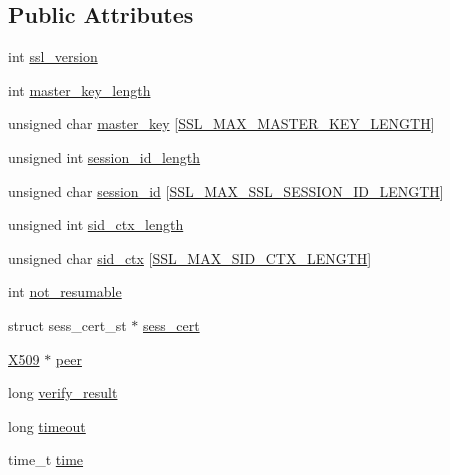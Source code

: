 \subsection*{Public Attributes}
\begin{DoxyCompactItemize}
\item 
int \hyperlink{structssl__session__st_a551e39a73ea78af29979d80d8a6db6f9}{ssl\+\_\+version}
\item 
int \hyperlink{structssl__session__st_a368c71211d55bcd3528a752c15e14e5d}{master\+\_\+key\+\_\+length}
\item 
unsigned char \hyperlink{structssl__session__st_ae0d5ecf4472dbff80b1ed36ce9c051c3}{master\+\_\+key} \mbox{[}\hyperlink{ssl_8h_ab96c69cdc3051de20ca9bb157d790f4a}{S\+S\+L\+\_\+\+M\+A\+X\+\_\+\+M\+A\+S\+T\+E\+R\+\_\+\+K\+E\+Y\+\_\+\+L\+E\+N\+G\+TH}\mbox{]}
\item 
unsigned int \hyperlink{structssl__session__st_a593371acd210b99ad600853361b807ce}{session\+\_\+id\+\_\+length}
\item 
unsigned char \hyperlink{structssl__session__st_a3e03d6073d29316d9eaecb78938ec92f}{session\+\_\+id} \mbox{[}\hyperlink{ssl_8h_a918194c29290f107e9440a722af9c2c6}{S\+S\+L\+\_\+\+M\+A\+X\+\_\+\+S\+S\+L\+\_\+\+S\+E\+S\+S\+I\+O\+N\+\_\+\+I\+D\+\_\+\+L\+E\+N\+G\+TH}\mbox{]}
\item 
unsigned int \hyperlink{structssl__session__st_a22ec3aac135c2b8268e0ea69c66fc829}{sid\+\_\+ctx\+\_\+length}
\item 
unsigned char \hyperlink{structssl__session__st_ad465f7554a5e14d6c92ee563d5ed6fe1}{sid\+\_\+ctx} \mbox{[}\hyperlink{ssl_8h_a5cef804495c6414283f4f29d4cea0dd0}{S\+S\+L\+\_\+\+M\+A\+X\+\_\+\+S\+I\+D\+\_\+\+C\+T\+X\+\_\+\+L\+E\+N\+G\+TH}\mbox{]}
\item 
int \hyperlink{structssl__session__st_a1b4d198b4cf95c73b1e73b06cf521bac}{not\+\_\+resumable}
\item 
struct sess\+\_\+cert\+\_\+st $\ast$ \hyperlink{structssl__session__st_abd0e4711818e1c3373870f0e09d718be}{sess\+\_\+cert}
\item 
\hyperlink{ossl__typ_8h_a4f666bde6518f95deb3050c54b408416}{X509} $\ast$ \hyperlink{structssl__session__st_a925bea83587ffedbbdb4aa386b75a2d7}{peer}
\item 
long \hyperlink{structssl__session__st_a448769f219815a3a49b726d5ab288783}{verify\+\_\+result}
\item 
long \hyperlink{structssl__session__st_a69db42a9260a726806b5f6f92923c90b}{timeout}
\item 
time\+\_\+t \hyperlink{structssl__session__st_afa2f9b8bc29e2d00641c609f54bcfc4b}{time}

\end{DoxyCompactItemize}
